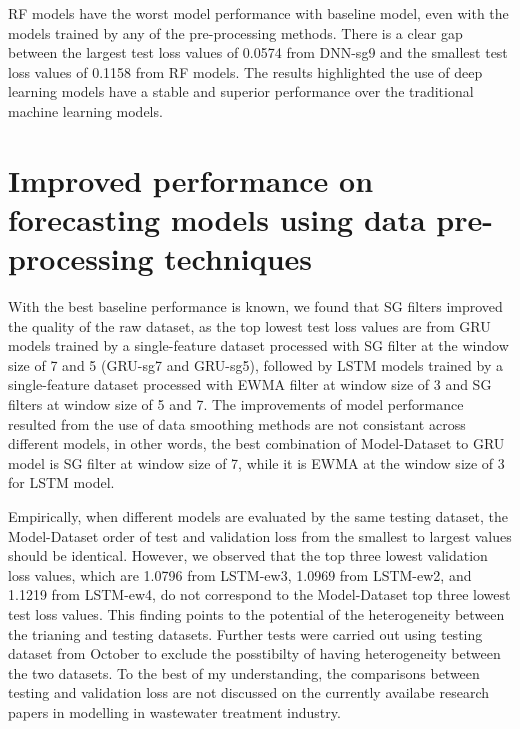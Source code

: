 RF models have the worst model performance with baseline model, even with the models trained by any of the pre-processing methods. There is a clear gap between the largest test loss values of 0.0574 from DNN-sg9 and the smallest test loss values of 0.1158 from RF models. The results highlighted the use of deep learning models have a stable and superior performance over the traditional machine learning models.

\section{Improved performance on forecasting models using data pre-processing techniques}
With the best baseline performance is known, we found that SG filters improved the quality of the raw dataset, as the top lowest test loss values are from GRU models trained by a single-feature dataset processed with SG filter at the window size of 7 and 5 (GRU-sg7 and GRU-sg5), followed by LSTM models trained by a single-feature dataset processed with EWMA filter at window size of 3 and SG filters at window size of 5 and 7. The improvements of model performance resulted from the use of data smoothing methods are not consistant across different models, in other words, the best combination of Model-Dataset to GRU model is SG filter at window size of 7, while it is EWMA at the window size of 3 for LSTM model.

Empirically, when different models are evaluated by the same testing dataset, the Model-Dataset order of test and validation loss from the smallest to largest values should be identical. However, we observed that the top three lowest validation loss values, which are 1.0796 from LSTM-ew3, 1.0969 from LSTM-ew2, and 1.1219 from LSTM-ew4, do not correspond to the Model-Dataset top three lowest test loss values. This finding points to the potential of the heterogeneity between the trianing and testing datasets. Further tests were carried out using testing dataset from October to exclude the posstibilty of having heterogeneity between the two datasets. To the best of my understanding, the comparisons between testing and validation loss are not discussed on the currently availabe research papers in modelling in wastewater treatment industry.


